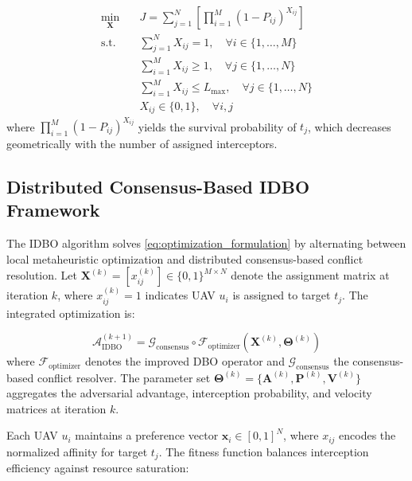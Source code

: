 \documentclass[lettersize,journal]{IEEEtran}
\begin{document}
\begin{equation}
\label{eq:optimization_formulation}
\begin{aligned}
\min_{\mathbf{X}} \quad & J = \sum_{j=1}^{N} \left[ \prod_{i=1}^{M} \left(1 - P_{ij}\right)^{X_{ij}} \right] \\
\text{s.t.} \quad & \sum_{j=1}^{N} X_{ij} = 1, \quad \forall i \in \{1,\dots,M\} \\
& \sum_{i=1}^{M} X_{ij} \geq 1, \quad \forall j \in \{1,\dots,N\} \\
& \sum_{i=1}^{M} X_{ij} \leq L_{\max}, \quad \forall j \in \{1,\dots,N\} \\
& X_{ij} \in \{0,1\}, \quad \forall i,j
\end{aligned}
\end{equation}
where $\prod_{i=1}^{M} (1 - P_{ij})^{X_{ij}}$ yields the survival probability of $t_j$, which decreases geometrically with the number of assigned interceptors.

\subsection{Distributed Consensus-Based IDBO Framework}
\label{subsec:idbo_algorithm}

The IDBO algorithm solves \eqref{eq:optimization_formulation} by alternating between local metaheuristic optimization and distributed consensus-based conflict resolution. Let $\mathbf{X}^{(k)} = [x_{ij}^{(k)}] \in \{0,1\}^{M \times N}$ denote the assignment matrix at iteration $k$, where $x_{ij}^{(k)}=1$ indicates UAV $u_i$ is assigned to target $t_j$. The integrated optimization is:

\begin{equation}
\label{eq:hierarchical}
\mathcal{A}_{\text{IDBO}}^{(k+1)} = \mathcal{G}_{\text{consensus}} \circ \mathcal{F}_{\text{optimizer}} \left( \mathbf{X}^{(k)}, \boldsymbol{\Theta}^{(k)} \right)
\end{equation}
where $\mathcal{F}_{\text{optimizer}}$ denotes the improved DBO operator and $\mathcal{G}_{\text{consensus}}$ the consensus-based conflict resolver. The parameter set $\boldsymbol{\Theta}^{(k)} = \{\mathbf{A}^{(k)}, \mathbf{P}^{(k)}, \mathbf{V}^{(k)}\}$ aggregates the adversarial advantage, interception probability, and velocity matrices at iteration $k$.

Each UAV $u_i$ maintains a preference vector $\mathbf{x}_i \in [0,1]^{N}$, where $x_{ij}$ encodes the normalized affinity for target $t_j$. The fitness function balances interception efficiency against resource saturation:
\end{document}
